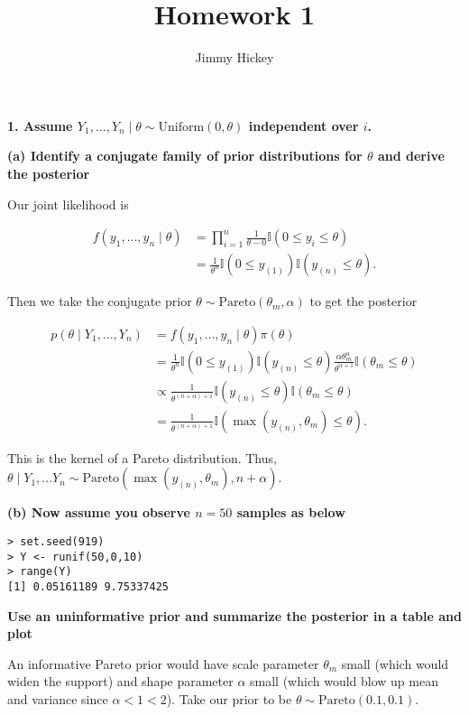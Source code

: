 \documentclass[
]{article}
\title{Homework 1}
\author{Jimmy Hickey}
\date{}
\begin{document}
\maketitle

\textbf{1. Assume
\(Y_{1}, \dots , Y_{n} \mid \theta \sim \text{Uniform}(0,\theta)\)
independent over \(i\).}

\textbf{(a) Identify a conjugate family of prior distributions for
\(\theta\) and derive the posterior}

Our joint likelihood is

\begin{align*}
f(y_{1} , \dots , y_{n} \mid \theta) & = \prod_{i=1}^{n} \frac{ 1 }{  \theta-0} \mathbb{I}(0 \leq y_{i} \leq \theta) \\
& = \frac{  1}{ \theta^{n} } \mathbb{I}(0 \leq y_{(1)}) \mathbb{I}(y_{(n)} \leq \theta).
\end{align*}

Then we take the conjugate prior
\(\theta \sim \text{Pareto}(\theta_{m}, \alpha)\) to get the posterior

\begin{align*}
p(\theta \mid Y_{1} , \dots , Y_{n}) & = f(y_{1} , \dots , y_{n} \mid \theta) \pi(\theta) \\
& = \frac{  1}{ \theta^{n} } \mathbb{I}(0 \leq y_{(1)}) \mathbb{I}(y_{(n)} \leq \theta) \frac{\alpha \theta_{m}^{\alpha}  }{ \theta^{\alpha+1} } \mathbb{I}(\theta_{m} \leq \theta) \\
& \propto \frac{1  }{ \theta^{(n+\alpha) + 1} } \mathbb{I}(y_{(n)} \leq \theta) \mathbb{I}(\theta_{m} \leq \theta) \\
& =  \frac{1  }{ \theta^{(n+\alpha) + 1} } \mathbb{I}(\max (y_{(n)}, \theta_{m}) \leq \theta).
\end{align*}

This is the kernel of a Pareto distribution. Thus,
\(\theta \mid Y_{1}, \dots Y_{n} \sim \text{Pareto}(\max(y_{(n)}, \theta_{m}), n + \alpha)\).

\textbf{(b) Now assume you observe \(n=50\) samples as below}

\begin{verbatim}
> set.seed(919)
> Y <- runif(50,0,10)
> range(Y)
[1] 0.05161189 9.75337425
\end{verbatim}

\textbf{Use an uninformative prior and summarize the posterior in a
table and plot}

An informative Pareto prior would have scale parameter \(\theta_{m}\)
small (which would widen the support) and shape parameter \(\alpha\)
small (which would blow up mean and variance since \(\alpha < 1 < 2\)).
Take our prior to be \(\theta \sim \text{Pareto}(0.1, 0.1)\).
\end{document}
